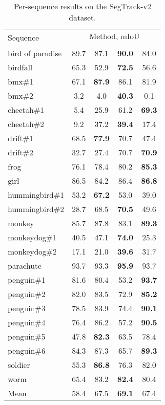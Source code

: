 \documentclass[10pt,twocolumn,letterpaper]{article}
\begin{document}
\begin{table}[h]
\begin{centering}
\begingroup
\begin{tabular}{l@{  }|@{   }c@{   }c@{   }c@{   }c@{   }}
\multirow{2}{*}{Sequence} & \multicolumn{4}{c}{Method, mIoU}\\
&  \cite{Maerki2016Cvpr} &  \cite{Tsai2016Cvpr}&  \cite{Xiao2016Cvpr} &  \tabularnewline
\hline
\hline
bird of paradise & 89.7 & 87.1 & \bf 90.0 &84.0 \\
birdfall & 65.3 & 52.9 &  \bf 72.5& 56.6 \\
bmx\#1 & 67.1 &  \bf 87.9 & 86.1 &81.9 \\
bmx\#2 & 3.2 & 4.0 & \bf  40.3 & 0.1 \\
cheetah\#1 & 5.4 & 25.9 & 61.2 &  \bf 69.3 \\
cheetah\#2 & 9.2 & 37.2 &  \bf 39.4 & 17.4 \\
drift\#1 & 68.5 & \bf  77.9 & 70.7 & 47.4 \\
drift\#2 & 32.7 & 27.4 & 70.7 &  \bf 70.9 \\
frog & 76.1 & 78.4 & 80.2 &  \bf  85.3 \\
girl & 86.5 & 84.2 & 86.4 &  \bf 86.8 \\
hummingbird\#1 & 53.2 & \bf  67.2 & 53.0 & 39.0 \\
hummingbird\#2 & 28.7 & 68.5 &  \bf 70.5 & 49.6 \\
monkey & 85.7 & 87.8 & 83.1 &  \bf 89.3 \\
monkeydog\#1 & 40.5 & 47.1 &  \bf 74.0 & 25.3 \\
monkeydog\#2 & 17.1 & 21.0 &  \bf 39.6 & 31.7 \\
parachute & 93.7 & 93.3 &  \bf 95.9 & 93.7 \\
penguin\#1 & 81.6 & 80.4 & 53.2 &  \bf 93.7 \\
penguin\#2 & 82.0 & 83.5 & 72.9 &  \bf 85.2 \\
penguin\#3 & 78.5 & 83.9 & 74.4 &  \bf 90.1 \\
penguin\#4 & 76.4 & 86.2 & 57.2 & \bf  90.5 \\
penguin\#5 & 47.8 &  \bf 82.3 & 63.5 & 78.4 \\
penguin\#6 & 84.3 & 87.3 & 65.7 &  \bf 89.3 \\
soldier & 55.3 & \bf  86.8 & 76.3 & 82.0 \\
worm & 65.4 & 83.2 & \bf  82.4 &80.4 \\
\hline
Mean  &  58.4   &     67.5  & \bf 69.1 & 67.4   \\
\end{tabular}\endgroup
\par\end{centering}
\caption{\label{tab:segtrack_seq}Per-sequence results on the SegTrack-v2 dataset.}
\end{table}
\end{document}
